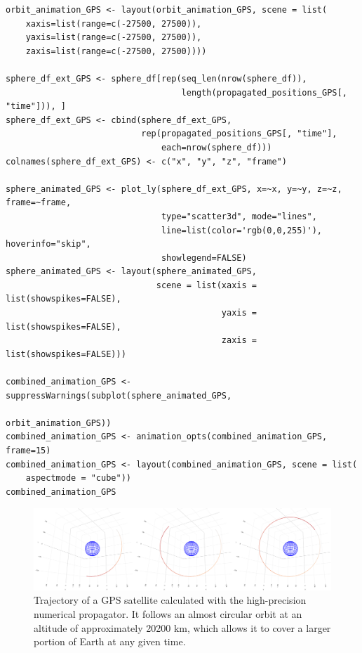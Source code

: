 \begin{verbatim}
orbit_animation_GPS <- layout(orbit_animation_GPS, scene = list(
    xaxis=list(range=c(-27500, 27500)),
    yaxis=list(range=c(-27500, 27500)),
    zaxis=list(range=c(-27500, 27500))))

sphere_df_ext_GPS <- sphere_df[rep(seq_len(nrow(sphere_df)), 
                                   length(propagated_positions_GPS[, "time"])), ]
sphere_df_ext_GPS <- cbind(sphere_df_ext_GPS, 
                           rep(propagated_positions_GPS[, "time"],
                               each=nrow(sphere_df)))
colnames(sphere_df_ext_GPS) <- c("x", "y", "z", "frame")

sphere_animated_GPS <- plot_ly(sphere_df_ext_GPS, x=~x, y=~y, z=~z, frame=~frame, 
                               type="scatter3d", mode="lines", 
                               line=list(color='rgb(0,0,255)'), hoverinfo="skip",
                               showlegend=FALSE)
sphere_animated_GPS <- layout(sphere_animated_GPS,
                              scene = list(xaxis = list(showspikes=FALSE), 
                                           yaxis = list(showspikes=FALSE),
                                           zaxis = list(showspikes=FALSE)))

combined_animation_GPS <- suppressWarnings(subplot(sphere_animated_GPS,
                                                   orbit_animation_GPS))
combined_animation_GPS <- animation_opts(combined_animation_GPS, frame=15)
combined_animation_GPS <- layout(combined_animation_GPS, scene = list(
    aspectmode = "cube"))
combined_animation_GPS
\end{verbatim}

\begin{figure}[H]

{\centering \includegraphics[width=0.99\linewidth]{static/GPS_static} 

}

\caption{Trajectory of a GPS satellite calculated with the high-precision numerical propagator. It follows an almost circular orbit at an altitude of approximately 20200 km, which allows it to cover a larger portion of Earth at any given time.}\label{fig:hpop-GPS-figure-static}
\end{figure}

